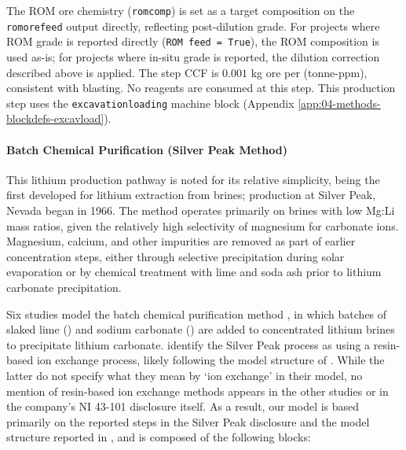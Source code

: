 \documentclass{article}
\renewcommand\_{\textunderscore\allowbreak}
\begin{document}
The ROM ore chemistry (\texttt{rom\_comp}) is set as a target composition on the \texttt{rom\_ore\_feed} output directly, reflecting post-dilution grade. For projects where ROM grade is reported directly (\texttt{ROM feed = True}), the ROM composition is used as-is; for projects where in-situ grade is reported, the dilution correction described above is applied. The step CCF is $0.001$ kg ore per (tonne-ppm), consistent with blasting. No reagents are consumed at this step. This production step uses the \texttt{excavation\_loading} machine block (Appendix \ref{app:04-methods-blockdefs-excavload}).

\paragraph{Batch Chemical Purification (Silver Peak Method)}\label{app:04-methods-facilitychoices-batchchem}\leavevmode\par

This lithium production pathway is noted for its relative simplicity, being the first developed for lithium extraction from brines; production at Silver Peak, Nevada began in 1966. The method operates primarily on brines with low Mg:Li mass ratios, given the relatively high selectivity of magnesium for carbonate ions. Magnesium, calcium, and other impurities are removed as part of earlier concentration steps, either through selective precipitation during solar evaporation or by chemical treatment with lime and soda ash prior to lithium carbonate precipitation.

Six studies model the batch chemical purification method \citep{ambroseUnderstandingFutureLithium2020b, wesselkaemperOptimizationProcessingCosts2025, fengEnvironmentalImpactsLithium2025, sunRobustAssessmentsLithium2025, mousavinezhadNextLithiumBoom2025, schenkerCurrentFutureImpacts2025}, in which batches of slaked lime () and sodium carbonate () are added to concentrated lithium brines to precipitate lithium carbonate. \citet{mousavinezhadNextLithiumBoom2025} identify the Silver Peak process as using a resin-based ion exchange process, likely following the model structure of \citet{schenkerCurrentFutureImpacts2025}. While the latter do not specify what they mean by `ion exchange' in their model, no mention of resin-based ion exchange methods appears in the other studies or in the company's NI 43-101 disclosure itself. As a result, our model is based primarily on the reported steps in the Silver Peak disclosure and the model structure reported in \citet{wesselkaemperOptimizationProcessingCosts2025}, and is composed of the following blocks: 
\end{document}
